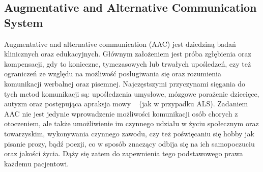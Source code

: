 \documentclass[twoside,a4paper]{book}
\begin{document}
\subsection{Augmentative and Alternative Communication System}


Augmentative and alternative communication (AAC) jest dziedziną badań klinicznych oraz edukacyjnych. Głównym założeniem jest próba zgłębienia oraz kompensacji, gdy to konieczne, tymczasowych lub trwałych upośledzeń, czy też ograniczeń ze względu na możliwość posługiwania się oraz rozumienia komunikacji werbalnej oraz pisemnej.  Najczęstszymi przyczynami sięgania do tych metod komunikacji są: upośledzenia umysłowe, mózgowe porażenie dziecięce, autyzm oraz postępująca apraksja mowy ~\cite{augmentative} (jak w przypadku ALS). Zadaniem AAC nie jest jedynie wprowadzenie możliwości komunikacji osób chorych z otoczeniem, ale także umożliwienie im czynnego udziału w życiu społecznym oraz towarzyskim, wykonywania czynnego zawodu, czy też poświęcaniu się hobby jak pisanie prozy, bądź poezji, co w sposób znaczący odbija się na ich samopoczuciu oraz jakości życia. Dąży się zatem do zapewnienia tego podstawowego prawa każdemu pacjentowi. 
\end{document}
